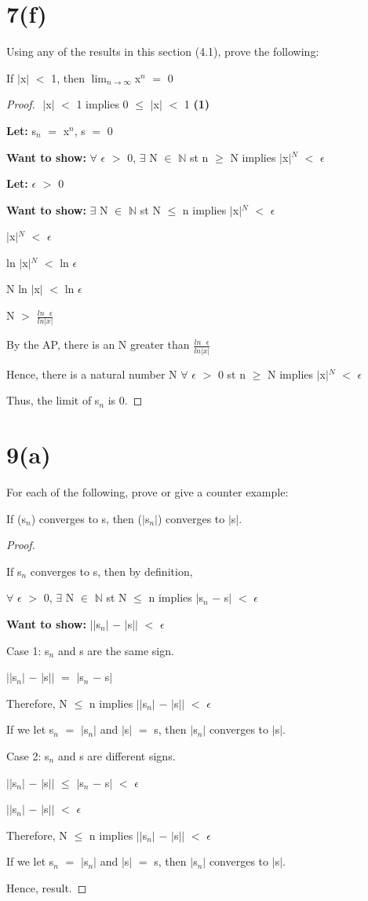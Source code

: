 \documentclass{article}
\newcommand{\mt}[1]{\ensuremath{#1}}
\newcommand\bsc[2][\DefaultOpt]{%
  \def\DefaultOpt{#2}%
  \section[#1]{#2}%
}
\newcommand{\bgpf}{\begin{proof} $ $\newline}
\newcommand{\lt}[1]{\textbf{Let: } #1}
\newcommand{\wts}[1]{\textbf{Want to show: } #1}
\newcommand{\bpth}[1]{\textbf{(#1)}}
\newcommand{\epf}{\end{proof}}
\newcommand{\bn}{\mt{\mathbb{N}} }       %
\newcommand{\ep}{\mt{\epsilon} }         %
\newcommand{\fa}{\mt{\forall} }          %
\newcommand{\mem}{\mt{\in} }
\newcommand{\exs}{\mt{\exists} }
\newcommand{\av}[1]{\mt{|}#1\mt{|}}  %
\newcommand{\prn}[1]{(#1)}
\newcommand{\ms}{\mt{-} }
\newcommand{\ls}{\mt{<} }
\newcommand{\gr}{\mt{>} }
\newcommand{\lse}{\mt{\leq} }
\newcommand{\gre}{\mt{\geq} }
\newcommand{\eql}{\mt{=} }
\newcommand{\uw}[2]{#1\mt{_{#2}}}
\newcommand{\uf}[2]{#1\mt{^{#2}}}
\newcommand{\frc}[2]{\mt{\frac{#1}{#2}}}
\newcommand{\lmti}[1]{\mt{\displaystyle{\lim_{#1 \to \infty}}}}
\begin{document}
\bsc{7(f)}{

Using any of the results in this section (4.1), prove the following:

If \av{x} \ls 1, then \lmti{n}\uf{x}{n} \eql 0

\bgpf
\av{x} \ls 1 implies  0 \lse \av{x} \ls 1 \bpth{1}

\lt{\uw{s}{n} \eql \uf{x}{n}, s \eql 0}

\wts{\fa \ep \gr 0, \exs N \mem \bn st n \gre N implies \uf{\av{x}}{N} \ls \ep}

\lt{\ep \gr 0}

\wts{\exs N \mem \bn st N \lse n implies \uf{\av{x}}{N} \ls \ep}

\uf{\av{x}}{N} \ls \ep

ln \uf{\av{x}}{N} \ls ln \ep

N ln \av{x} \ls ln \ep

N \gr \frc{ln\textrm{ }\ep}{ln \av{x}}

By the AP, there is an N greater than \frc{ln\textrm{ }\ep}{ln \av{x}}

Hence, there is a natural number N \fa \ep \gr 0 st n \gre N implies \uf{\av{x}}{N} \ls \ep

Thus, the limit of \uw{s}{n} is 0.

\epf

}

\bsc{9(a)}{
For each of the following, prove or give a counter example:

If (\uw{s}{n}) converges to s, then \prn{\av{\uw{s}{n}}} converges to \av{s}.

\bgpf

If \uw{s}{n} converges to s, then by definition,

\fa \ep \gr 0, \exs N \mem \bn st N \lse n implies \av{\uw{s}{n} \ms s} \ls \ep

\wts{\av{\av{\uw{s}{n}} \ms \av{s}} \ls \ep}

Case 1: \uw{s}{n} and s are the same sign.

\av{\av{\uw{s}{n}} \ms \av{s}} \eql \av{\uw{s}{n} \ms s}

Therefore, N \lse n implies \av{\av{\uw{s}{n}} \ms \av{s}} \ls \ep

If we let \uw{s}{n} \eql \av{\uw{s}{n}} and \av{s} \eql s, then \av{\uw{s}{n}} converges to \av{s}.

Case 2: \uw{s}{n} and s are different signs.

\av{\av{\uw{s}{n}} \ms \av{s}} \lse \av{\uw{s}{n} \ms s} \ls \ep

\av{\av{\uw{s}{n}} \ms \av{s}} \ls \ep

Therefore, N \lse n implies \av{\av{\uw{s}{n}} \ms \av{s}} \ls \ep

If we let \uw{s}{n} \eql \av{\uw{s}{n}} and \av{s} \eql s, then \av{\uw{s}{n}} converges to \av{s}.

Hence, result.

\epf

}
\end{document}

